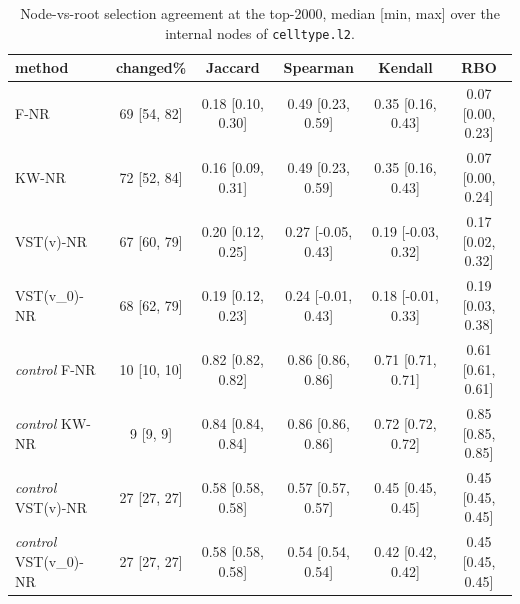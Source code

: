 \begin{table}[t]
\centering
\small
\begin{tabular}{lccccc}
\toprule
method & changed\% & Jaccard & Spearman & Kendall & RBO \\
\midrule
F-NR & 69 [54, 82] & 0.18 [0.10, 0.30] & 0.49 [0.23, 0.59] & 0.35 [0.16, 0.43] & 0.07 [0.00, 0.23] \\
KW-NR & 72 [52, 84] & 0.16 [0.09, 0.31] & 0.49 [0.23, 0.59] & 0.35 [0.16, 0.43] & 0.07 [0.00, 0.24] \\
VST(v)-NR & 67 [60, 79] & 0.20 [0.12, 0.25] & 0.27 [-0.05, 0.43] & 0.19 [-0.03, 0.32] & 0.17 [0.02, 0.32] \\
VST(v\_0)-NR & 68 [62, 79] & 0.19 [0.12, 0.23] & 0.24 [-0.01, 0.43] & 0.18 [-0.01, 0.33] & 0.19 [0.03, 0.38] \\
\midrule
\textit{control} F-NR & 10 [10, 10] & 0.82 [0.82, 0.82] & 0.86 [0.86, 0.86] & 0.71 [0.71, 0.71] & 0.61 [0.61, 0.61] \\
\textit{control} KW-NR & 9 [9, 9] & 0.84 [0.84, 0.84] & 0.86 [0.86, 0.86] & 0.72 [0.72, 0.72] & 0.85 [0.85, 0.85] \\
\textit{control} VST(v)-NR & 27 [27, 27] & 0.58 [0.58, 0.58] & 0.57 [0.57, 0.57] & 0.45 [0.45, 0.45] & 0.45 [0.45, 0.45] \\
\textit{control} VST(v\_0)-NR & 27 [27, 27] & 0.58 [0.58, 0.58] & 0.54 [0.54, 0.54] & 0.42 [0.42, 0.42] & 0.45 [0.45, 0.45] \\
\bottomrule
\end{tabular}
\caption{Node-vs-root selection agreement at the top-2000, median [min, max] over the internal nodes of \texttt{celltype.l2}.}
\label{tab:hvg-summary-hao-L2}
\end{table}